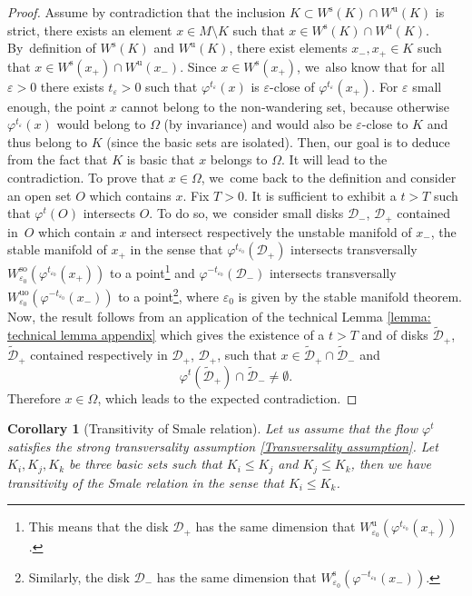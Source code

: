 \documentclass[JEP,XML,SOM,Unicode,NoEqCountersInSection,NoFloatCountersInSection,published]{cedram}
\newcommand{\rs}{\mathrm{s}}
\newcommand{\rso}{\mathrm{so}}
\newcommand{\ru}{\mathrm{u}}
\newcommand{\ruo}{\mathrm{uo}}
\theoremstyle{definition}
\theoremstyle{plain}
\newtheorem{corollary}[definition]{Corollary}
\newcommand{\D}{\mathcal{D}}
\begin{document}
\begin{appendix}
\begin{proof}
Assume by contradiction that the inclusion $K \subset W^\rs (K) \cap W^\ru (K)$ is strict, \ie there exists an element $x \in M \setminus K$ such that $x \in W^\rs (K) \cap W^\ru (K)$. By~definition of $W^\rs (K)$ and $W^\ru (K)$, there exist elements $x_-, x_+ \in K$ such that $x \in W^\rs (x_+) \cap W^\ru (x_-)$. Since $x \in W^\rs (x_{+})$, we~also know that for all $\varepsilon > 0$ there exists $t_{\varepsilon} > 0$ such that $\varphi^{t_{\varepsilon}} (x)$ is $\varepsilon$-close of $\varphi^{t_{\varepsilon}} (x_+)$. For $\varepsilon$ small enough, the point $x$ cannot belong to the non-wandering set, because otherwise $\varphi^{t_{\varepsilon}} (x)$ would belong to $\Omega$ (by invariance) and would also be $\varepsilon$-close to $K$ and thus belong to $K$ (since the basic sets are isolated). Then, our goal is to deduce from the fact that $K$ is basic that $x$ belongs to $\Omega$. It will lead to the contradiction. To prove that $x \in \Omega$, we~come back to the definition and consider an open set $O$ which contains $x$. Fix $T > 0$. It is sufficient to exhibit a $t > T$ such that $\varphi^t (O)$ intersects $O$. To do so, we~consider small disks $\D_{-}$, $\D_{+}$ contained in~$O$ which contain $x$ and intersect respectively the unstable manifold of $x_-$, the stable manifold of $x_+$ in the sense that $\varphi^{t_{\varepsilon_0}} (\D_+)$ intersects transversally $W_{\varepsilon_0}^{\rso} (\varphi^{t_{\varepsilon_0}} (x_+))$ to a point\footnote{This means that the disk $\D_+$ has the same dimension that $W_{\varepsilon_0}^\ru (\varphi^{t_{\varepsilon_0}} (x_+))$.} and $\varphi^{-t_{\varepsilon_0}} (\D_-)$ intersects transversally $W_{\varepsilon_0}^{\ruo} (\varphi^{-t_{\varepsilon_0}} (x_-))$ to a point\footnote{Similarly, the disk $\D_-$ has the same dimension that $W_{\varepsilon_0}^{\rs} (\varphi^{-t_{\varepsilon_0}} (x_-))$.}, where $\varepsilon_0$ is given by the stable manifold theorem. Now, the result follows from an application of the technical Lemma \ref{lemma: technical lemma appendix} which gives the existence of a $t > T$ and of disks $\widetilde{\D}_{+}$, $\widetilde{\D}_{+}$ contained respectively in $\D_{+}$, $\D_{+}$, such that $x \in \widetilde{\D}_+ \cap \widetilde{\D}_-$ and
\[
\varphi^t (\widetilde{\D}_{+}) \cap \widetilde{\D}_{-} \neq \emptyset.
\]
Therefore $x \in \Omega$, which leads to the expected contradiction.
\end{proof}

\begin{corollary}[Transitivity of Smale relation]\label{cor: transitivity of Smale relation}
Let us assume that the flow $\varphi^t$ satisfies the strong transversality assumption \eqref{Transversality assumption}. Let $K_i, K_j, K_k$ be three basic sets such that $K_i \leq K_j$ and $K_j \leq K_k$, then we have transitivity of the Smale relation in the sense that $K_i \leq K_k$.
\end{corollary}


\end{appendix}
\end{document}

